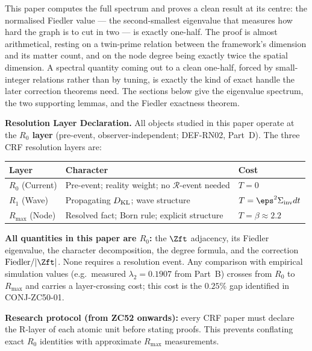 \documentclass[12pt, a4paper]{article}
\begin{document}
This paper computes the full spectrum and proves a clean result at its centre:
the normalised Fiedler value --- the second-smallest eigenvalue that measures how
hard the graph is to cut in two --- is exactly one-half. The proof is almost
arithmetical, resting on a twin-prime relation between the framework's dimension
and its matter count, and on the node degree being exactly twice the spatial
dimension. A spectral quantity coming out to a clean one-half, forced by small-
integer relations rather than by tuning, is exactly the kind of exact handle the
later correction theorems need. The sections below give the eigenvalue spectrum,
the two supporting lemmas, and the Fiedler exactness theorem.
\label{sec:zc52}

\begin{layerbox}
\textbf{Resolution Layer Declaration.}
All objects studied in this paper operate at the \textbf{$R_0$ layer}
(pre-event, observer-independent; DEF-RN02, Part~D).
The three CRF resolution layers are:
\begin{center}
\begin{tabular}{@{}lp{5.5cm}l@{}}
\toprule
\textbf{Layer} & \textbf{Character} & \textbf{Cost} \\
\midrule
$R_0$ (Current) & Pre-event; reality weight; no $\mathcal{R}$-event needed
  & $T=0$ \\
$R_1$ (Wave) & Propagating $D_{\rm KL}$; wave structure
  & $T=\eps^2\Sigma_{\rm inv}dt$ \\
$R_{\max}$ (Node) & Resolved fact; Born rule; explicit structure
  & $T=\beta\approx2.2$ \\
\bottomrule
\end{tabular}
\end{center}
\textbf{All quantities in this paper are $R_0$:}
the $\Zft$ adjacency, its Fiedler eigenvalue, the character
decomposition, the degree formula, and the correction
$\text{Fiedler}/|\Zft|$. None requires a resolution event.
Any comparison with empirical simulation values
(e.g.\ measured $\lambda_2 = 0.1907$ from Part~B) crosses
from $R_0$ to $R_{\max}$ and carries a layer-crossing cost;
this cost is the $0.25\%$ gap identified in CONJ-ZC50-01.

\textbf{Research protocol (from ZC52 onwards):}
every CRF paper must declare the R-layer of each atomic unit
before stating proofs. This prevents conflating exact $R_0$
identities with approximate $R_{\max}$ measurements.
\end{layerbox}
\end{document}
